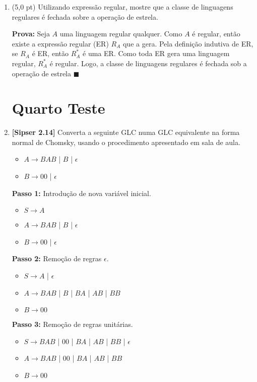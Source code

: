 \documentclass[12pt,a4paper,oneside]{article}
\begin{document}
\begin{enumerate}
	\item (5,0 pt) Utilizando expressão regular, mostre que a classe de linguagens regulares é fechada sobre a operação de estrela.	
	
	\vspace*{0.3cm}
	
	{\color{blue}
		{\bf Prova:} Seja $A$ uma linguagem regular qualquer. Como $A$ é  regular, então existe a expressão regular (ER) $R_A$ que a gera. Pela definição indutiva de ER, se $R_A$ é ER, então $R_A ^ *$ é uma ER. Como toda ER gera uma linguagem regular, $R_A ^ *$ é regular. Logo, a classe de linguagens regulares é fechada sob a operação de estrela $\blacksquare$
	}

\newpage
	
	\section*{Quarto Teste}
	
	\item {\bf [Sipser 2.14]}  Converta a seguinte GLC numa GLC equivalente na forma normal de Chomsky,
	usando o procedimento apresentado em sala de aula.
	\begin{itemize}
		\item[] $A \rightarrow BAB$ | $B$ | $\epsilon$
		\item[] $B \rightarrow 00$ | $\epsilon$
	\end{itemize}

	\vspace*{0.3cm}
	
	{\color{blue}
		{\bf Passo 1:} Introdução de nova variável inicial.
		\begin{itemize}
			\item[] $S \rightarrow A$
			\item[] $A \rightarrow BAB$ | $B$ | $\epsilon$
			\item[] $B \rightarrow 00$ | $\epsilon$
		\end{itemize}
	
		{\bf Passo 2:} Remoção de regras $\epsilon$.
		\begin{itemize}
			\item[] $S \rightarrow A$ | $\epsilon$
			\item[] $A \rightarrow BAB$ | $B$ | $BA$ | $AB$ | $BB$
			\item[] $B \rightarrow 00$
		\end{itemize}
	
		{\bf Passo 3:} Remoção de regras unitárias.
		\begin{itemize}
			\item[] $S \rightarrow BAB$ | $00$ | $BA$ | $AB$ | $BB$ | $\epsilon$
			\item[] $A \rightarrow BAB$ | $00$ | $BA$ | $AB$ | $BB$
			\item[] $B \rightarrow 00$
		\end{itemize}
	
}
\end{enumerate}
\end{document}

